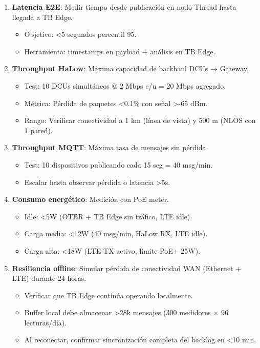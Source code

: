 \begin{enumerate}
    \item \textbf{Latencia E2E}: Medir tiempo desde publicación en nodo Thread hasta llegada a TB Edge.
    \begin{itemize}
        \item Objetivo: <5 segundos percentil 95.
        \item Herramienta: timestamps en payload + análisis en TB Edge.
    \end{itemize}
    
    \item \textbf{Throughput HaLow}: Máxima capacidad de backhaul DCUs → Gateway.
    \begin{itemize}
        \item Test: 10 DCUs simultáneos @ 2 Mbps c/u = 20 Mbps agregado.
        \item Métrica: Pérdida de paquetes <0.1\% con señal >-65 dBm.
        \item Rango: Verificar conectividad a 1 km (línea de vista) y 500 m (NLOS con 1 pared).
    \end{itemize}
    
    \item \textbf{Throughput MQTT}: Máxima tasa de mensajes sin pérdida.
    \begin{itemize}
        \item Test: 10 dispositivos publicando cada 15 seg = 40 msg/min.
        \item Escalar hasta observar pérdida o latencia >5s.
    \end{itemize}
    
    \item \textbf{Consumo energético}: Medición con PoE meter.
    \begin{itemize}
        \item Idle: <5W (OTBR + TB Edge sin tráfico, LTE idle).
        \item Carga media: <12W (40 msg/min, HaLow RX, LTE idle).
        \item Carga alta: <18W (LTE TX activo, límite PoE+ 25W).
    \end{itemize}
    
    \item \textbf{Resiliencia offline}: Simular pérdida de conectividad WAN (Ethernet + LTE) durante 24 horas.
    \begin{itemize}
        \item Verificar que TB Edge continúa operando localmente.
        \item Buffer local debe almacenar >28k mensajes (300 medidores $\times$ 96 lecturas/día).
        \item Al reconectar, confirmar sincronización completa del backlog en <10 min.
    \end{itemize}
    

\end{enumerate}
